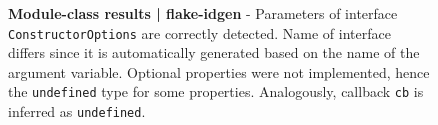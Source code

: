 \begin{figure}[tp]
	\centering
	\begin{lrbox}{\mintedbox}
		\begin{minipage}{0.8\textwidth}
		\end{minipage}
	\end{lrbox}

	\begin{lrbox}{\mintedbox}
		\begin{minipage}{0.8\textwidth}
		\end{minipage}
	\end{lrbox}

	\caption[Module-class results | flake-idgen]{\textbf{Module-class results | flake-idgen} - Parameters of interface \texttt{ConstructorOptions} are correctly detected. Name of interface differs since it is automatically generated based on the name of the argument variable. Optional properties were not implemented, hence the \texttt{undefined} type for some properties. Analogously, callback \texttt{cb} is inferred as \texttt{undefined}.}
	\label{fig:experiments-results-module-class-flake-idgen}
\end{figure}